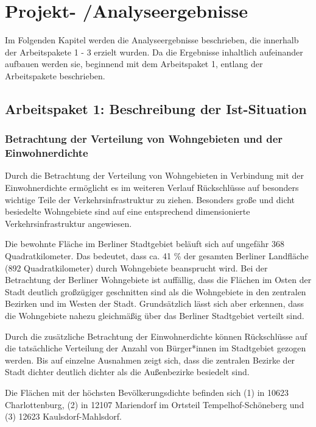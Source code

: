 \newpage
\section{Projekt- /Analyseergebnisse} \label{ergebnisse}

Im Folgenden Kapitel werden die Analyseergebnisse beschrieben, die innerhalb der Arbeitspakete 1 - 3 erzielt wurden. Da die Ergebnisse inhaltlich aufeinander aufbauen werden sie, beginnend mit dem Arbeitspaket 1, entlang der Arbeitspakete beschrieben. 
\subsection{Arbeitspaket 1: Beschreibung der Ist-Situation}

\subsubsection{Betrachtung der Verteilung von Wohngebieten und der Einwohnerdichte}

Durch die Betrachtung der Verteilung von Wohngebieten in Verbindung mit der Einwohnerdichte ermöglicht es im weiteren Verlauf Rückschlüsse auf besonders wichtige Teile der Verkehrsinfrastruktur zu ziehen. Besonders große und dicht besiedelte Wohngebiete sind auf eine entsprechend dimensionierte Verkehrsinfrastruktur angewiesen. 

Die bewohnte Fläche im Berliner Stadtgebiet beläuft sich auf ungefähr 368 Quadratkilometer. Das bedeutet, dass ca. 41 \% der gesamten Berliner Landfläche (892 Quadratkilometer) durch Wohngebiete beansprucht wird. Bei der Betrachtung der Berliner Wohngebiete ist auffällig, dass die Flächen im Osten der Stadt deutlich großzügiger geschnitten sind als die Wohngebiete in den zentralen Bezirken und im Westen der Stadt. Grundsätzlich lässt sich aber erkennen, dass die Wohngebiete nahezu gleichmäßig über das Berliner Stadtgebiet verteilt sind. 

Durch die zusätzliche Betrachtung der Einwohnerdichte können Rückschlüsse auf die tatsächliche Verteilung der Anzahl von Bürger*innen im Stadtgebiet gezogen werden. Bis auf einzelne Ausnahmen zeigt sich, dass die zentralen Bezirke der Stadt dichter deutlich dichter als die Außenbezirke besiedelt sind.

Die Flächen mit der höchsten Bevölkerungsdichte befinden sich (1) in 10623 Charlottenburg, (2) in 12107 Mariendorf im Ortsteil Tempelhof-Schöneberg und (3) 12623 Kaulsdorf-Mahlsdorf.


